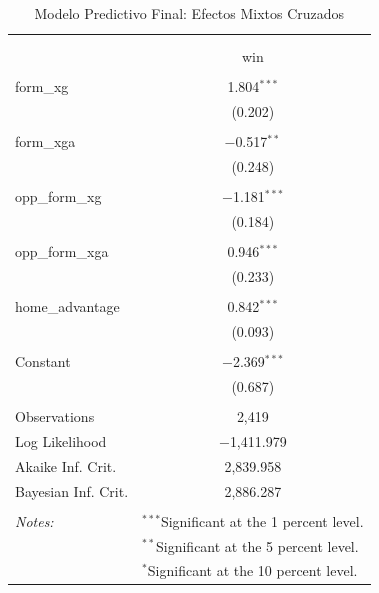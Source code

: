 
\begin{table}[!htbp] \centering 
  \caption{Modelo Predictivo Final: Efectos Mixtos Cruzados} 
  \label{} 
\begin{tabular}{@{\extracolsep{5pt}}lc} 
\\[-1.8ex]\hline 
\hline \\[-1.8ex] 
\\[-1.8ex] & win \\ 
\hline \\[-1.8ex] 
 form\_xg & 1.804$^{***}$ \\ 
  & (0.202) \\ 
  & \\ 
 form\_xga & $-$0.517$^{**}$ \\ 
  & (0.248) \\ 
  & \\ 
 opp\_form\_xg & $-$1.181$^{***}$ \\ 
  & (0.184) \\ 
  & \\ 
 opp\_form\_xga & 0.946$^{***}$ \\ 
  & (0.233) \\ 
  & \\ 
 home\_advantage & 0.842$^{***}$ \\ 
  & (0.093) \\ 
  & \\ 
 Constant & $-$2.369$^{***}$ \\ 
  & (0.687) \\ 
  & \\ 
Observations & 2,419 \\ 
Log Likelihood & $-$1,411.979 \\ 
Akaike Inf. Crit. & 2,839.958 \\ 
Bayesian Inf. Crit. & 2,886.287 \\ 
\hline \\[-1.8ex] 
\textit{Notes:} & \multicolumn{1}{l}{$^{***}$Significant at the 1 percent level.} \\ 
 & \multicolumn{1}{l}{$^{**}$Significant at the 5 percent level.} \\ 
 & \multicolumn{1}{l}{$^{*}$Significant at the 10 percent level.} \\ 
\end{tabular} 
\end{table} 
